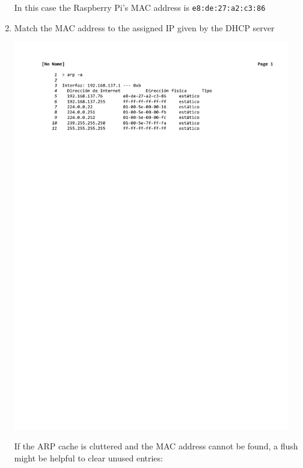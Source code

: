 \begin{enumerate}
		In this case the Raspberry Pi's MAC address is \texttt{e8:de:27:a2:c3:86}

	\item Match the MAC address to the assigned IP given by the DHCP server

		\hspace{0.05\textwidth}\includegraphics[width=0.95\textwidth,clip,trim={3.5cm 22.8cm 0 2.3cm}]{./files/arpnetwork.pdf}

		If the ARP cache is cluttered and the MAC address cannot be found, a flush might be helpful to clear unused entries:


\end{enumerate}
